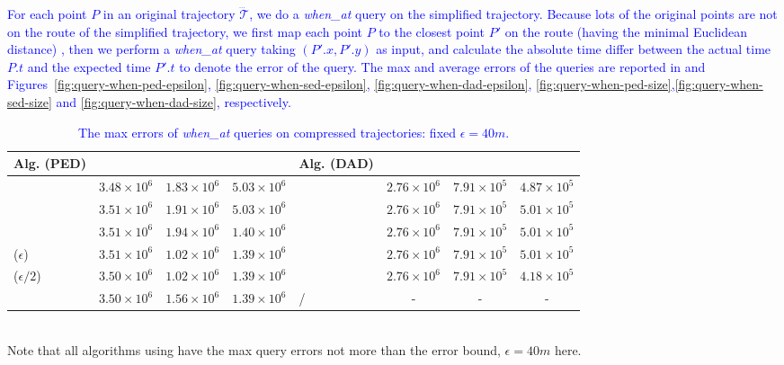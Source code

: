 \textcolor{blue}{For each point $P$ in an original trajectory $\dddot{\mathcal{T}}$, we do a \emph{when\_at} query on the simplified trajectory. Because lots of the original points are not on the route of the simplified trajectory, we first map each point $P$ to the closest point $P'$ on the route (having the minimal Euclidean distance) \cite{Cao:Spatio}, then we perform a \emph{when\_at} query taking $(P'.x, P'.y)$ as input, and calculate the absolute time differ between the actual time $P.t$ and the expected time $P'.t$ to denote the error of the query.}
%
\textcolor{blue}{The max and average errors of the queries are reported in  and Figures~\ref{fig:query-when-ped-epsilon}, \ref{fig:query-when-sed-epsilon}, \ref{fig:query-when-dad-epsilon}, \ref{fig:query-when-ped-size},\ref{fig:query-when-sed-size} and \ref{fig:query-when-dad-size}, respectively.}



\begin{table}
	\caption{\small \textcolor{blue}{The max errors of \emph{when\_at} queries on compressed trajectories: fixed $\epsilon=40m$.}}
	\centering
	\scriptsize
	\vspace{-1ex}
	\begin{tabular}{|l|c|c|c|l|c|c|c|}
		\hline
		\bf{Alg. (PED)}  &\ucar &\geolife &\mopsi & \bf{Alg. (DAD)}  &\ucar &\geolife &\mopsi \\
		\hline
		{\dpa} &	$3.48 \times 10^6$ & $1.83 \times 10^6$ &	$5.03 \times 10^6$	& \dpa	& $2.76 \times 10^6$	& $7.91 \times 10^5$	& $4.87 \times 10^5$ \\
		\hline
		{\tpa} &	$3.51 \times 10^6$ & $1.91 \times 10^6$ &	$5.03 \times 10^6$	& \tpa	& $2.76 \times 10^6$	& $7.91 \times 10^5$	& $5.01 \times 10^5$ \\
		\hline
		{\bqsa} &	$3.51 \times 10^6$ & $1.94 \times 10^6$ &	$1.40 \times 10^6$	& \opwa	& $2.76 \times 10^6$	& $7.91 \times 10^5$	& $5.01 \times 10^5$ \\
		\hline
		{\siped($\epsilon$)} &	$3.51 \times 10^6$ & $1.02 \times 10^6$ &	$1.39 \times 10^6$	& \interval	& $2.76 \times 10^6$	& $7.91 \times 10^5$	& $5.01 \times 10^5$ \\
		\hline
		{\siped($\epsilon/2$)} &	$3.50 \times 10^6$ & $1.02 \times 10^6$ &	$1.39 \times 10^6$	& \intersec	& $2.76 \times 10^6$	& $7.91 \times 10^5$	& $4.18 \times 10^5$ \\
		\hline
		{\operb} &	$3.50 \times 10^6$ & $1.56 \times 10^6$ &	$1.39 \times 10^6$	& / & -  & - & -  \\
		\hline
	\end{tabular}
	\label{tab:query-when-me}
	\vspace{0.5ex}
	\\{Note that all algorithms using \sed have the max query errors not more than the error bound, \ie $\epsilon=40m$ here.}
	\vspace{-1ex}
\end{table}


